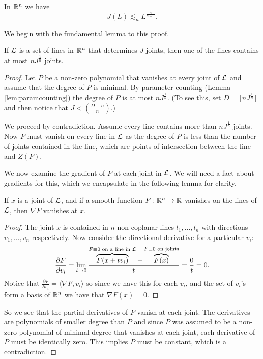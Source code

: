 \begin{theorem}
    In $\mathbb R^n$ we have
      $$J(L) \lesssim_n L^{\frac{n}{n-1}}.$$
\end{theorem}
We begin with the fundamental lemma to this proof. 
\begin{lemma}
    If $\mathcal L$ is a set of lines in $\mathbb R^n$ that determines $J$ joints, then one of the lines contains at most $nJ^{\frac{1}{n}}$ joints. \label{joints_bound}
\end{lemma}
\begin{proof}
Let $P$ be a non-zero polynomial that vanishes at every joint of $\mathcal L$ and assume that the degree of $P$ is minimal. By parameter counting (Lemma \ref{lem:paramcounting}) the degree of $P$ is at most 
$nJ^{\frac{1}{n}}$. (To see this, set $D = \lfloor nJ^{\frac{1}{n}}\rfloor$ and then notice that $J < {{D+n}\choose {n}}$.)

We proceed by contradiction. Assume every line contains more than $nJ^{\frac{1}{n}}$ joints.
 Now $P$ must vanish on every line in $\mathcal L$ as the degree of $P$ is less than the number of joints contained in the line, which are points of intersection between the line and $Z(P)$.

We now examine the gradient of $P$ at each joint in $\mathcal L$. We will need a fact about gradients for this, which we encapsulate in the following lemma for clarity.
\begin{lemma}
    If $x$ is a joint of $\mathcal L$, and if a smooth function $F: \mathbb R^n \to \mathbb R$ vanishes on the lines of $\mathcal L$, then $\nabla F$ vanishes at $x$. 
\end{lemma}
\begin{proof}
    The joint $x$ is contained in $n$ non-coplanar lines $l_1, \dots, l_n$ with directions $v_1, \dots , v_n$ respectively. 
    Now consider the directional derivative for a particular $v_i$:
    \[
    \frac{\partial F}{\partial v_i} = \lim_{t \to 0} \frac{ \overbrace{F(x+ tv_i)}^{F \equiv 0 \text{ on a line in $\mathcal L$}} - \overbrace{F(x)}^{F \equiv 0 \text{ on joints}}}{t} = \frac{0}{t} = 0.    
    \]
    Notice that $ \frac{\partial F}{\partial v_i} = \langle \nabla F, v_i\rangle$ so since we have this for each $v_i$, and the set of $v_i$'s form a basis of $\mathbb R^n$ we have that $\nabla F(x) = 0$.
\end{proof}
So we see that the partial derivatives of $P$ vanish at each joint. The derivatives are polynomials of
smaller degree than $P$ and since $P$ was assumed to be a non-zero polynomial of minimal degree that
vanishes at each joint, each derivative of $P$ must be identically zero. This implies $P$ must be
constant, which is 
a contradiction.
\end{proof}
